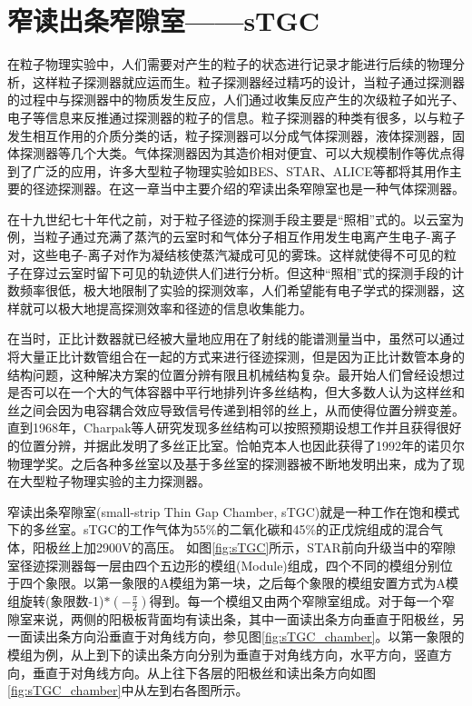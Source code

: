 \section{窄读出条窄隙室——sTGC}
\label{chap:3_2}

在粒子物理实验中，人们需要对产生的粒子的状态进行记录才能进行后续的物理分析，这样粒子探测器就应运而生。粒子探测器经过精巧的设计，当粒子通过探测器的过程中与探测器中的物质发生反应，人们通过收集反应产生的次级粒子如光子、电子等信息来反推通过探测器的粒子的信息。粒子探测器的种类有很多，以与粒子发生相互作用的介质分类的话，粒子探测器可以分成气体探测器，液体探测器，固体探测器等几个大类。气体探测器因为其造价相对便宜、可以大规模制作等优点得到了广泛的应用，许多大型粒子物理实验如BES、STAR、ALICE等都将其用作主要的径迹探测器。在这一章当中主要介绍的窄读出条窄隙室也是一种气体探测器。

在十九世纪七十年代之前，对于粒子径迹的探测手段主要是“照相”式的。以云室为例，当粒子通过充满了蒸汽的云室时和气体分子相互作用发生电离产生电子-离子对，这些电子-离子对作为凝结核使蒸汽凝成可见的雾珠。这样就使得不可见的粒子在穿过云室时留下可见的轨迹供人们进行分析。但这种“照相”式的探测手段的计数频率很低，极大地限制了实验的探测效率，人们希望能有电子学式的探测器，这样就可以极大地提高探测效率和径迹的信息收集能力。

在当时，正比计数器就已经被大量地应用在了射线的能谱测量当中，虽然可以通过将大量正比计数管组合在一起的方式来进行径迹探测，但是因为正比计数管本身的结构问题，这种解决方案的位置分辨有限且机械结构复杂。最开始人们曾经设想过是否可以在一个大的气体容器中平行地排列许多丝结构，但大多数人认为这样丝和丝之间会因为电容耦合效应导致信号传递到相邻的丝上，从而使得位置分辨变差。直到1968年，Charpak等人研究发现多丝结构可以按照预期设想工作并且获得很好的位置分辨，并据此发明了多丝正比室。恰帕克本人也因此获得了1992年的诺贝尔物理学奖。之后各种多丝室以及基于多丝室的探测器被不断地发明出来，成为了现在大型粒子物理实验的主力探测器。

窄读出条窄隙室(small-strip Thin Gap Chamber, sTGC)就是一种工作在饱和模式下的多丝室。sTGC的工作气体为55\%的二氧化碳和45\%的正戊烷组成的混合气体，阳极丝上加2900V的高压。
如图\ref{fig:sTGC}所示，STAR前向升级当中的窄隙室径迹探测器每一层由四个五边形的模组(Module)组成，四个不同的模组分别位于四个象限。以第一象限的A模组为第一块，之后每个象限的模组安置方式为A模组旋转(象限数-1)$*(-\frac{\pi}{2})$得到。每一个模组又由两个窄隙室组成。对于每一个窄隙室来说，两侧的阳极板背面均有读出条，其中一面读出条方向垂直于阳极丝，另一面读出条方向沿垂直于对角线方向，参见图\ref{fig:sTGC_chamber}。以第一象限的模组为例，从上到下的读出条方向分别为垂直于对角线方向，水平方向，竖直方向，垂直于对角线方向。从上往下各层的阳极丝和读出条方向如图\ref{fig:sTGC_chamber}中从左到右各图所示。

